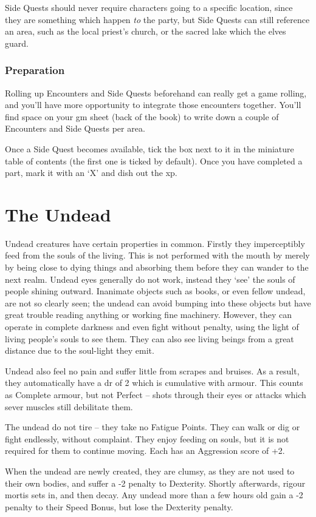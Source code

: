 \begin{multicols}{2}
Side Quests should never require characters going to a specific location, since they are something which happen \emph{to} the party, but Side Quests can still reference an area, such as the local priest's church, or the sacred lake which the elves guard.

\subsubsection{Preparation}

Rolling up Encounters and Side Quests beforehand can really get a game rolling, and you'll have more opportunity to integrate those encounters together.
You'll find space on your \gls{gm} sheet (back of the book) to write down a couple of Encounters and Side Quests per area.

Once a Side Quest becomes available, tick the box next to it in the miniature table of contents (the first one is ticked by default).
Once you have completed a part, mark it with an `X' and dish out the \gls{xp}.

\end{multicols}

\section{The Undead}

\begin{multicols}{2}

\noindent
Undead creatures have certain properties in common. Firstly they imperceptibly feed from the souls of the living. This is not performed with the mouth by merely by being close to dying things and absorbing them before they can wander to the next realm. Undead eyes generally do not work, instead they `see' the souls of people shining outward. Inanimate objects such as books, or even fellow undead, are not so clearly seen; the undead can avoid bumping into these objects but have great trouble reading anything or working fine machinery. However, they can operate in complete darkness and even fight without penalty, using the light of living people's souls to see them. They can also see living beings from a great distance due to the soul-light they emit.

Undead also feel no pain and suffer little from scrapes and bruises. As a result, they automatically have a \gls{dr} of 2 which is cumulative with armour. This counts as Complete armour, but not Perfect -- shots through their eyes or attacks which sever muscles still debilitate them.

The undead do not tire -- they take no Fatigue Points. They can walk or dig or fight endlessly, without complaint.
They enjoy feeding on souls, but it is not required for them to continue moving.
Each has an Aggression score of +2.

When the undead are newly created, they are clumsy, as they are not used to their own bodies, and suffer a -2 penalty to Dexterity.
Shortly afterwards, rigour mortis sets in, and then decay.
Any undead more than a few hours old gain a -2 penalty to their Speed Bonus, but lose the Dexterity penalty.

\end{multicols}


